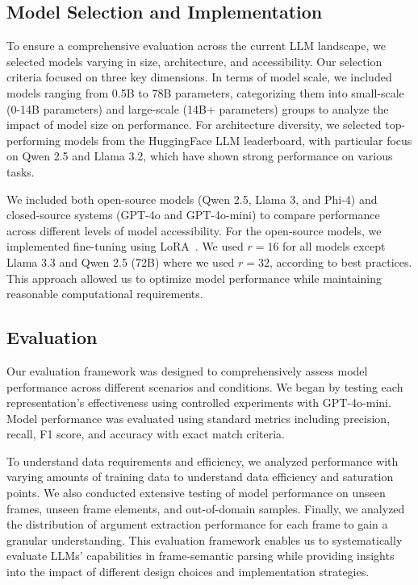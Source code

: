 \subsection{Model Selection and Implementation}
To ensure a comprehensive evaluation across the current LLM landscape, we selected models varying in size, architecture, and accessibility. Our selection criteria focused on three key dimensions. In terms of model scale, we included models ranging from 0.5B to 78B parameters, categorizing them into small-scale (0-14B parameters) and large-scale (14B+ parameters) groups to analyze the impact of model size on performance. For architecture diversity, we selected top-performing models from the HuggingFace LLM leaderboard, with particular focus on Qwen 2.5 and Llama 3.2, which have shown strong performance on various tasks.

We included both open-source models (Qwen 2.5, Llama 3, and Phi-4) and closed-source systems (GPT-4o and GPT-4o-mini) to compare performance across different levels of model accessibility. For the open-source models, we implemented fine-tuning using LoRA~\cite{hu2021loralowrankadaptationlarge}. We used $r=16$ for all models except Llama 3.3 and Qwen 2.5 (72B) where we used $r=32$, according to best practices. This approach allowed us to optimize model performance while maintaining reasonable computational requirements.

\subsection{Evaluation}
Our evaluation framework was designed to comprehensively assess model performance across different scenarios and conditions. We began by testing each representation's effectiveness using controlled experiments with GPT-4o-mini. Model performance was evaluated using standard metrics including precision, recall, F1 score, and accuracy with exact match criteria.

To understand data requirements and efficiency, we analyzed performance with varying amounts of training data to understand data efficiency and saturation points. We also conducted extensive testing of model performance on unseen frames, unseen frame elements, and out-of-domain samples. Finally, we analyzed the distribution of argument extraction performance for each frame to gain a granular understanding. This evaluation framework enables us to systematically evaluate LLMs' capabilities in frame-semantic parsing while providing insights into the impact of different design choices and implementation strategies.


